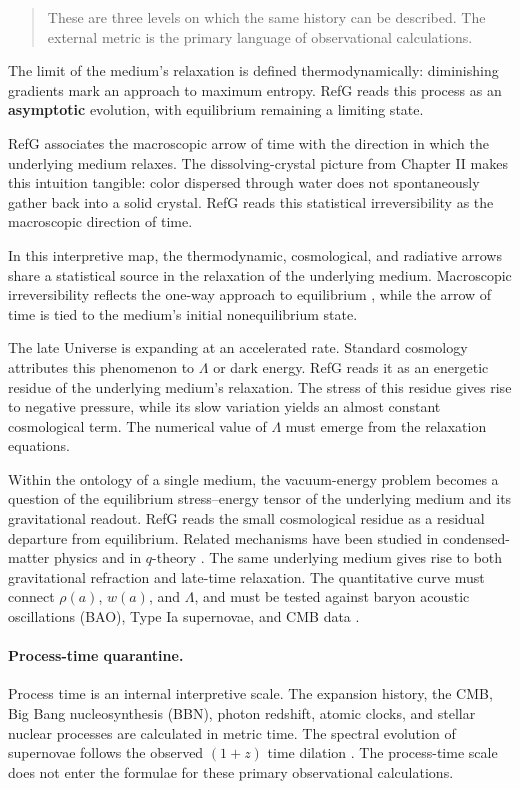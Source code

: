 \documentclass[11pt,a4paper]{article}
\begin{document}
\begin{quote}
These are three levels on which the same history can be described. The external metric is the primary language of observational calculations.
\end{quote}

The limit of the medium's relaxation is defined thermodynamically: diminishing gradients mark an approach to maximum entropy. RefG reads this process as an \textbf{asymptotic} evolution, with equilibrium remaining a limiting state.

RefG associates the macroscopic arrow of time with the direction in which the underlying medium relaxes. The dissolving-crystal picture from Chapter II makes this intuition tangible: color dispersed through water does not spontaneously gather back into a solid crystal. RefG reads this statistical irreversibility as the macroscopic direction of time.

In this interpretive map, the thermodynamic, cosmological, and radiative arrows share a statistical source in the relaxation of the underlying medium. Macroscopic irreversibility reflects the one-way approach to equilibrium \citep{planck1899}, while the arrow of time is tied to the medium's initial nonequilibrium state.

The late Universe is expanding at an accelerated rate. Standard cosmology attributes this phenomenon to $\Lambda$ or dark energy. RefG reads it as an energetic residue of the underlying medium's relaxation. The stress of this residue gives rise to negative pressure, while its slow variation yields an almost constant cosmological term. The numerical value of $\Lambda$ must emerge from the relaxation equations.

Within the ontology of a single medium, the vacuum-energy problem becomes a question of the equilibrium stress--energy tensor of the underlying medium and its gravitational readout. RefG reads the small cosmological residue as a residual departure from equilibrium. Related mechanisms have been studied in condensed-matter physics and in $q$-theory \citep{volovik2003,klinkhamer2008}. The same underlying medium gives rise to both gravitational refraction and late-time relaxation. The quantitative curve must connect $\rho(a)$, $w(a)$, and $\Lambda$, and must be tested against baryon acoustic oscillations (BAO), Type Ia supernovae, and CMB data \citep{abdulkarim2025,brout2022,planck2020}.

\paragraph{Process-time quarantine.}
Process time is an internal interpretive scale. The expansion history, the CMB, Big Bang nucleosynthesis (BBN), photon redshift, atomic clocks, and stellar nuclear processes are calculated in metric time. The spectral evolution of supernovae follows the observed $(1+z)$ time dilation \citep{blondin2008}. The process-time scale does not enter the formulae for these primary observational calculations.
\end{document}
